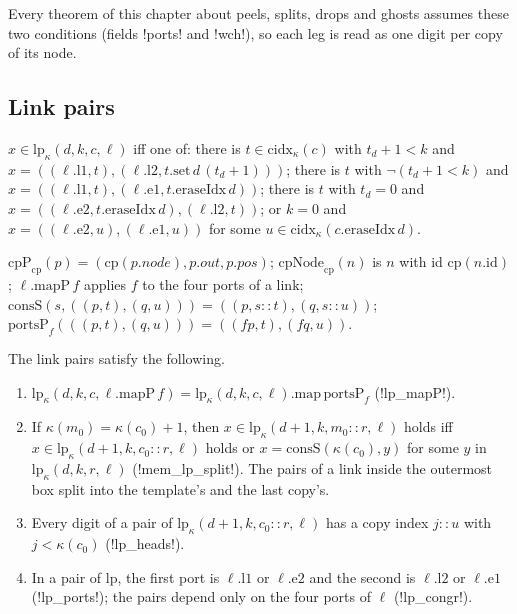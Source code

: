 Every theorem of this chapter about peels, splits, drops and ghosts assumes these two conditions (fields \lean!ports! and \lean!wch!), so each leg is read as one digit per copy of its node.

\subsection{Link pairs}

\begin{proposition}\label{prop:lean-sym-mem-lp}
$x\in\mathrm{lp}_\kappa(d,k,c,\ell)$ iff one of: there is $t\in\mathrm{cidx}_\kappa(c)$ with $t_d+1<k$ and $x=((\ell.\mathrm{l1},t),(\ell.\mathrm{l2},t.\mathrm{set}\,d\,(t_d+1)))$; there is $t$ with $\lnot(t_d+1<k)$ and $x=((\ell.\mathrm{l1},t),(\ell.\mathrm{e1},t.\mathrm{eraseIdx}\,d))$; there is $t$ with $t_d=0$ and $x=((\ell.\mathrm{e2},t.\mathrm{eraseIdx}\,d),(\ell.\mathrm{l2},t))$; or $k=0$ and $x=((\ell.\mathrm{e2},u),(\ell.\mathrm{e1},u))$ for some $u\in\mathrm{cidx}_\kappa(c.\mathrm{eraseIdx}\,d)$.
\end{proposition}

\begin{definition}
$\mathrm{cpP}_{\mathrm{cp}}(p)=(\mathrm{cp}(p.\mathit{node}),p.\mathit{out},p.\mathit{pos})$; $\mathrm{cpNode}_{\mathrm{cp}}(n)$ is $n$ with id $\mathrm{cp}(n.\mathrm{id})$; $\ell.\mathrm{mapP}\,f$ applies $f$ to the four ports of a link; $\mathrm{consS}(s,((p,t),(q,u)))=((p,s\mathbin{::}t),(q,s\mathbin{::}u))$; $\mathrm{portsP}_f(((p,t),(q,u)))=((f p,t),(f q,u))$.
\end{definition}

\begin{proposition}
The link pairs satisfy the following.
\begin{enumerate}
\item $\mathrm{lp}_\kappa(d,k,c,\ell.\mathrm{mapP}\,f)=\mathrm{lp}_\kappa(d,k,c,\ell).\mathrm{map}\,\mathrm{portsP}_f$ (\lean!lp_mapP!).
\item If $\kappa(m_0)=\kappa(c_0)+1$, then $x\in\mathrm{lp}_\kappa(d+1,k,m_0\mathbin{::}r,\ell)$ holds iff $x\in\mathrm{lp}_\kappa(d+1,k,c_0\mathbin{::}r,\ell)$ holds or $x=\mathrm{consS}(\kappa(c_0),y)$ for some $y$ in $\mathrm{lp}_\kappa(d,k,r,\ell)$ (\lean!mem_lp_split!). The pairs of a link inside the outermost box split into the template's and the last copy's.
\item Every digit of a pair of $\mathrm{lp}_\kappa(d+1,k,c_0\mathbin{::}r,\ell)$ has a copy index $j\mathbin{::}u$ with $j<\kappa(c_0)$ (\lean!lp_heads!).
\item In a pair of $\mathrm{lp}$, the first port is $\ell.\mathrm{l1}$ or $\ell.\mathrm{e2}$ and the second is $\ell.\mathrm{l2}$ or $\ell.\mathrm{e1}$ (\lean!lp_ports!); the pairs depend only on the four ports of $\ell$ (\lean!lp_congr!).
\end{enumerate}
\end{proposition}

